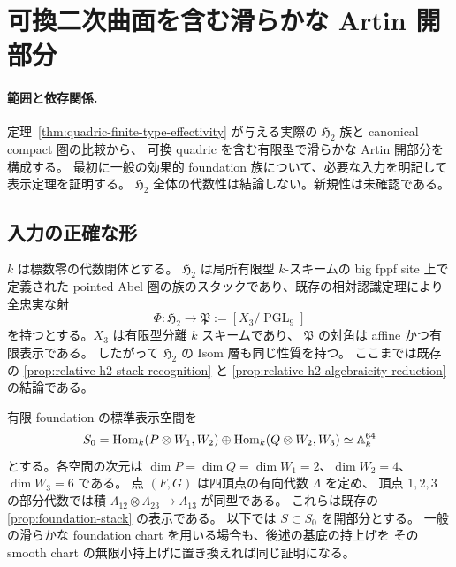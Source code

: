 \section{可換二次曲面を含む滑らかな Artin 開部分}
\label{sec:quadric-smooth-atlas}

\paragraph{範囲と依存関係.}
定理~\ref{thm:quadric-finite-type-effectivity} が与える実際の
$\mathfrak H_2$ 族と canonical compact 圏の比較から、
可換 quadric を含む有限型で滑らかな Artin 開部分を構成する。
最初に一般の効果的 foundation 族について、必要な入力を明記して表示定理を証明する。
$\mathfrak H_2$ 全体の代数性は結論しない。新規性は未確認である。

\subsection{入力の正確な形}

$k$ は標数零の代数閉体とする。
$\mathfrak H_2$ は局所有限型 $k$-スキームの big fppf site 上で定義された
pointed Abel 圏の族のスタックであり、既存の相対認識定理により
全忠実な射
\[
 \Phi:\mathfrak H_2\longrightarrow\mathfrak P
 :=[X_3/\operatorname{PGL}_9]
\]
を持つとする。$X_3$ は有限型分離 $k$ スキームであり、
$\mathfrak P$ の対角は affine かつ有限表示である。
したがって $\mathfrak H_2$ の Isom 層も同じ性質を持つ。
ここまでは既存の
\ref{prop:relative-h2-stack-recognition} と
\ref{prop:relative-h2-algebraicity-reduction} の結論である。

有限 foundation の標準表示空間を
\[
 S_0=\operatorname{Hom}_k(P\otimes W_1,W_2)
       \oplus\operatorname{Hom}_k(Q\otimes W_2,W_3)
       \simeq\mathbb A_k^{64}
\]
とする。各空間の次元は
$\dim P=\dim Q=\dim W_1=2$、$\dim W_2=4$、$\dim W_3=6$ である。
点 $(F,G)$ は四頂点の有向代数 $\Lambda$ を定め、
頂点 $1,2,3$ の部分代数では積
$\Lambda_{12}\otimes\Lambda_{23}\to\Lambda_{13}$ が同型である。
これらは既存の \ref{prop:foundation-stack} の表示である。
以下では $S\subset S_0$ を開部分とする。
一般の滑らかな foundation chart を用いる場合も、後述の基底の持上げを
その smooth chart の無限小持上げに置き換えれば同じ証明になる。

